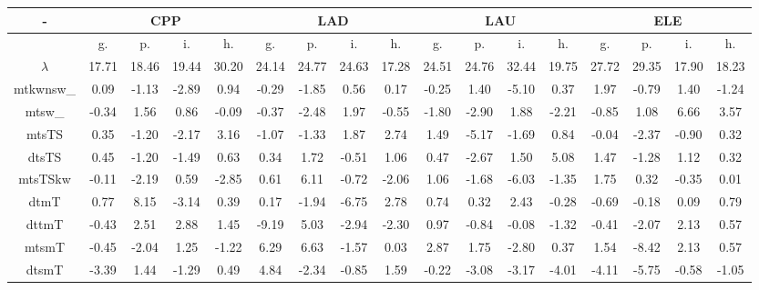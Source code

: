 \documentclass[%
 aip,
 jmp,%
 amsmath,amssymb,
 reprint,%
]{revtex4-1}
\begin{document}
\begin{table}
  \centering
    \footnotesize
\setlength{\tabcolsep}{.26667em}
\begin{tabular}{|c|| c|c|c|c|| c|c|c|c|| c|c|c|c|| c|c|c|c|}\hline
-\-  & \multicolumn{4}{c|}{CPP} & \multicolumn{4}{c|}{LAD} & \multicolumn{4}{c|}{LAU} & \multicolumn{4}{c|}{ELE} \\ \hline\hline
 & g. & p. & i. & h. &     g. & p. & i. & h. &    g. & p. & i. & h. &    g. & p. & i. & h. \\\hline
$\lambda$ & 17.71 & 18.46 & 19.44 & 30.20 & 24.14 & 24.77 & 24.63 & 17.28 & 24.51 & 24.76 & 32.44 & 19.75 & 27.72 & 29.35 & 17.90 & 18.23 \\\hline
mtkwnsw\_ & 0.09 & -1.13 & -2.89 & 0.94 & -0.29 & -1.85 & 0.56 & 0.17 & -0.25 & 1.40 & -5.10 & 0.37 & 1.97 & -0.79 & 1.40 & -1.24 \\\hline
mtsw\_ & -0.34 & 1.56 & 0.86 & -0.09 & -0.37 & -2.48 & 1.97 & -0.55 & -1.80 & -2.90 & 1.88 & -2.21 & -0.85 & 1.08 & 6.66 & 3.57 \\\hline
mtsTS & 0.35 & -1.20 & -2.17 & 3.16 & -1.07 & -1.33 & 1.87 & 2.74 & 1.49 & -5.17 & -1.69 & 0.84 & -0.04 & -2.37 & -0.90 & 0.32 \\\hline
dtsTS & 0.45 & -1.20 & -1.49 & 0.63 & 0.34 & 1.72 & -0.51 & 1.06 & 0.47 & -2.67 & 1.50 & 5.08 & 1.47 & -1.28 & 1.12 & 0.32 \\\hline
mtsTSkw & -0.11 & -2.19 & 0.59 & -2.85 & 0.61 & 6.11 & -0.72 & -2.06 & 1.06 & -1.68 & -6.03 & -1.35 & 1.75 & 0.32 & -0.35 & 0.01 \\\hline
dtmT & 0.77 & 8.15 & -3.14 & 0.39 & 0.17 & -1.94 & -6.75 & 2.78 & 0.74 & 0.32 & 2.43 & -0.28 & -0.69 & -0.18 & 0.09 & 0.79 \\\hline
dttmT & -0.43 & 2.51 & 2.88 & 1.45 & -9.19 & 5.03 & -2.94 & -2.30 & 0.97 & -0.84 & -0.08 & -1.32 & -0.41 & -2.07 & 2.13 & 0.57 \\\hline
mtsmT & -0.45 & -2.04 & 1.25 & -1.22 & 6.29 & 6.63 & -1.57 & 0.03 & 2.87 & 1.75 & -2.80 & 0.37 & 1.54 & -8.42 & 2.13 & 0.57 \\\hline
dtsmT & -3.39 & 1.44 & -1.29 & 0.49 & 4.84 & -2.34 & -0.85 & 1.59 & -0.22 & -3.08 & -3.17 & -4.01 & -4.11 & -5.75 & -0.58 & -1.05 \\\hline

\end{tabular}
\end{table}
\end{document}
